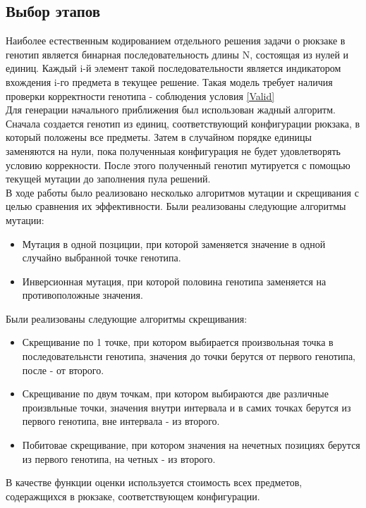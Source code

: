 \subsection{Выбор этапов}%
Наиболее естественным кодированием отдельного решения задачи о рюкзаке в генотип является бинарная последовательность длины N, состоящая из нулей и единиц.
Каждый i-й элемент такой последовательности является индикатором вхождения i-го предмета в текущее решение. Такая модель требует наличия проверки корректности генотипа - соблюдения условия \ref{Valid} 
\\ Для генерации начального приближения был использован жадный алгоритм. Сначала создается генотип из единиц, соответствующий конфигурации рюкзака, в который положены все предметы. Затем в случайном порядке единицы заменяются на нули, пока полученныая конфигурация не будет удовлетворять условию коррекности. После этого полученный генотип мутируется с помощью текущей мутации до заполнения пула решений.
\\ В ходе работы было реализовано несколько алгоритмов мутации и скрещивания с целью сравнения их эффективности. Были реализованы следующие алгоритмы мутации:
\begin{itemize}
	\item Мутация в одной позциции, при которой заменяется значение в одной случайно выбранной точке генотипа.
	\item Инверсионная мутация, при которой половина генотипа заменяется на противоположные значения.
\end{itemize}
 Были реализованы следующие алгоритмы скрещивания:
 \begin{itemize}
	\item Скрещивание по 1 точке, при котором выбирается произвольная точка в последовательнсти генотипа, значения до точки берутся от первого генотипа, после - от второго. 
	\item Скрещивание по двум точкам, при котором выбираются две различные произвльные точки, значения внутри интервала и в самих точках берутся из первого генотипа, вне интервала - из второго. 
	\item Побитовае скрещивание, при котором значения на нечетных позициях берутся из первого генотипа, на четных - из второго.  
 \end{itemize}
 В качестве функции оценки используется стоимость всех предметов, содеражщихся в рюкзаке, соответствующем конфигурации.
 
